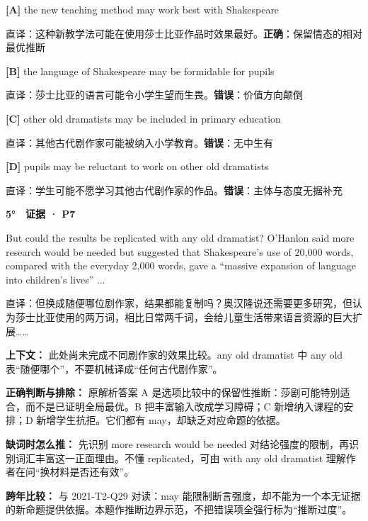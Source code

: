 \documentclass[11pt,a4paper]{article}
\begin{document}
\noindent\textbf{[A]} the new teaching method may work best with Shakespeare\par\nopagebreak
\noindent 直译：这种新教学法可能在使用莎士比亚作品时效果最好。\quad\textbf{正确}：保留情态的相对最优推断\par\smallskip
{}\noindent\textbf{[B]} the language of Shakespeare may be formidable for pupils\par\nopagebreak
\noindent 直译：莎士比亚的语言可能令小学生望而生畏。\quad\textbf{错误}：价值方向颠倒\par\smallskip
{}\noindent\textbf{[C]} other old dramatists may be included in primary education\par\nopagebreak
\noindent 直译：其他古代剧作家可能被纳入小学教育。\quad\textbf{错误}：无中生有\par\smallskip
{}\noindent\textbf{[D]} pupils may be reluctant to work on other old dramatists\par\nopagebreak
\noindent 直译：学生可能不愿学习其他古代剧作家的作品。\quad\textbf{错误}：主体与态度无据补充\par\smallskip
\begin{evidence}\textbf{5°　证据 · P7}\par But could the results be replicated with any old dramatist? O’Hanlon said more research would be needed but suggested that Shakespeare’s use of 20,000 words, compared with the everyday 2,000 words, gave a “massive expansion of language into children’s lives” ...\par 直译：但换成随便哪位剧作家，结果都能复制吗？奥汉隆说还需要更多研究，但认为莎士比亚使用的两万词，相比日常两千词，会给儿童生活带来语言资源的巨大扩展……\end{evidence}
\noindent\textbf{上下文：} 此处尚未完成不同剧作家的效果比较。any old dramatist 中 any old 表“随便哪个”，不要机械译成“任何古代剧作家”。\par\smallskip
\noindent\textbf{正确判断与排除：} 原解析答案 A 是选项比较中的保留性推断：莎剧可能特别适合，而不是已证明全局最优。B 把丰富输入改成学习障碍；C 新增纳入课程的安排；D 新增学生抗拒。它们都有 may，却缺乏对应命题的依据。\par\smallskip
\noindent\textbf{缺词时怎么推：} 先识别 more research would be needed 对结论强度的限制，再识别词汇丰富这一正面理由。不懂 replicated，可由 with any old dramatist 理解作者在问“换材料是否还有效”。\par\smallskip
\noindent\textbf{跨年比较：} 与 2021-T2-Q29 对读：may 能限制断言强度，却不能为一个本无证据的新命题提供依据。本题作推断边界示范，不把错误项全强行标为“推断过度”。\par\smallskip
\clearpage
\end{document}
